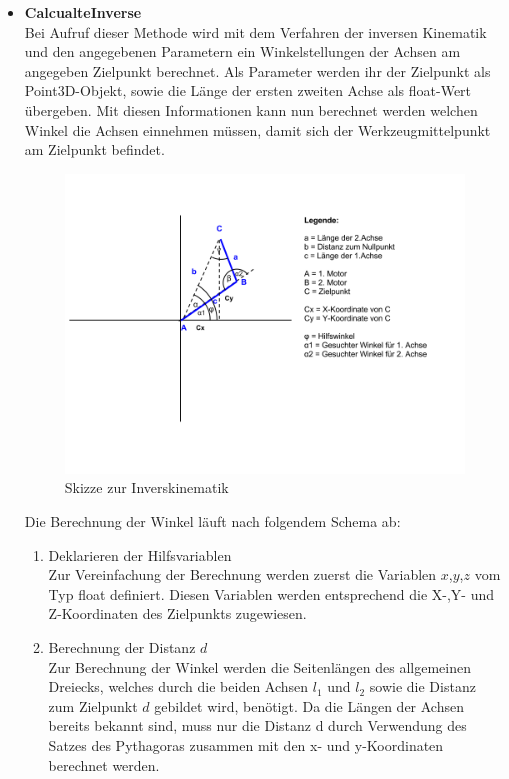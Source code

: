 \begin{itemize}
\begin{enumerate}
\begin{itemize}
\end{itemize}
\end{enumerate}
\item \textbf{CalcualteInverse}\\
Bei Aufruf dieser Methode wird mit dem Verfahren der inversen Kinematik und den angegebenen Parametern ein Winkelstellungen der Achsen am angegeben Zielpunkt berechnet. Als Parameter werden ihr der Zielpunkt als Point3D-Objekt, sowie die Länge der ersten zweiten Achse als float-Wert übergeben. Mit diesen Informationen kann nun berechnet werden welchen Winkel die Achsen einnehmen müssen, damit  sich der Werkzeugmittelpunkt am Zielpunkt befindet.\\
\begin{figure}[H]
  \centering
  \begin{minipage}[t]{12 cm}
  	\centering
  	\includegraphics[width=12cm]{images/Inverskinematik} 
    \caption{Skizze zur Inverskinematik}
  \end{minipage}
\end{figure}
Die Berechnung der Winkel läuft nach folgendem Schema ab:
\begin{enumerate}
\item Deklarieren der Hilfsvariablen\\
Zur Vereinfachung der Berechnung werden zuerst die Variablen $x$,$y$,$z$ vom Typ float definiert. Diesen Variablen werden entsprechend die X-,Y- und Z-Koordinaten des Zielpunkts zugewiesen.
\item Berechnung der Distanz $d$\\
Zur Berechnung der Winkel werden die Seitenlängen des allgemeinen Dreiecks, welches durch die beiden Achsen $l_1$ und $l_2$ sowie die Distanz zum Zielpunkt $d$ gebildet wird, benötigt. Da die Längen der Achsen bereits bekannt sind, muss nur die Distanz d durch Verwendung des Satzes des Pythagoras zusammen mit den x- und y-Koordinaten berechnet werden.\\

\end{enumerate}
\end{itemize}

